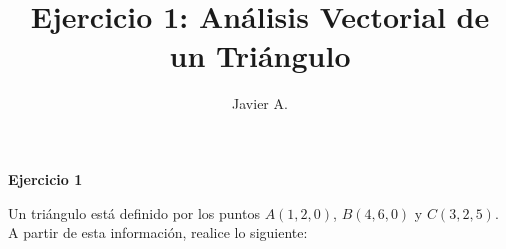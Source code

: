 \documentclass{article}
\title{\Large \textbf{Ejercicio 1: Análisis Vectorial de un Triángulo}}
\author{Javier A.}
\date{}
\begin{document}
\maketitle

\begin{center}
\colorbox{gray!10}{\parbox{0.95\textwidth}{
\vspace{0.3cm}
\centering
\textbf{\large Ejercicio 1}
\vspace{0.2cm}

\begin{minipage}{0.9\textwidth}
Un triángulo está definido por los puntos $A(1,2,0)$, $B(4,6,0)$ y $C(3,2,5)$. A partir de esta información, realice lo siguiente:
\end{minipage}
\vspace{0.3cm}
}}
\end{center}
\end{document}
